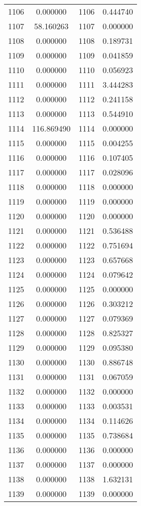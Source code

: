 \documentclass[12pt]{article}
\begin{document}
\begin{longtable}{@{}cccc@{}}
1106 & 0.000000 & 1106 & 0.444740 \\
1107 & 58.160263 & 1107 & 0.000000 \\
1108 & 0.000000 & 1108 & 0.189731 \\
1109 & 0.000000 & 1109 & 0.041859 \\
1110 & 0.000000 & 1110 & 0.056923 \\
1111 & 0.000000 & 1111 & 3.444283 \\
1112 & 0.000000 & 1112 & 0.241158 \\
1113 & 0.000000 & 1113 & 0.544910 \\
1114 & 116.869490 & 1114 & 0.000000 \\
1115 & 0.000000 & 1115 & 0.004255 \\
1116 & 0.000000 & 1116 & 0.107405 \\
1117 & 0.000000 & 1117 & 0.028096 \\
1118 & 0.000000 & 1118 & 0.000000 \\
1119 & 0.000000 & 1119 & 0.000000 \\
1120 & 0.000000 & 1120 & 0.000000 \\
1121 & 0.000000 & 1121 & 0.536488 \\
1122 & 0.000000 & 1122 & 0.751694 \\
1123 & 0.000000 & 1123 & 0.657668 \\
1124 & 0.000000 & 1124 & 0.079642 \\
1125 & 0.000000 & 1125 & 0.000000 \\
1126 & 0.000000 & 1126 & 0.303212 \\
1127 & 0.000000 & 1127 & 0.079369 \\
1128 & 0.000000 & 1128 & 0.825327 \\
1129 & 0.000000 & 1129 & 0.095380 \\
1130 & 0.000000 & 1130 & 0.886748 \\
1131 & 0.000000 & 1131 & 0.067059 \\
1132 & 0.000000 & 1132 & 0.000000 \\
1133 & 0.000000 & 1133 & 0.003531 \\
1134 & 0.000000 & 1134 & 0.114626 \\
1135 & 0.000000 & 1135 & 0.738684 \\
1136 & 0.000000 & 1136 & 0.000000 \\
1137 & 0.000000 & 1137 & 0.000000 \\
1138 & 0.000000 & 1138 & 1.632131 \\
1139 & 0.000000 & 1139 & 0.000000 \\

\end{longtable}
\end{document}
